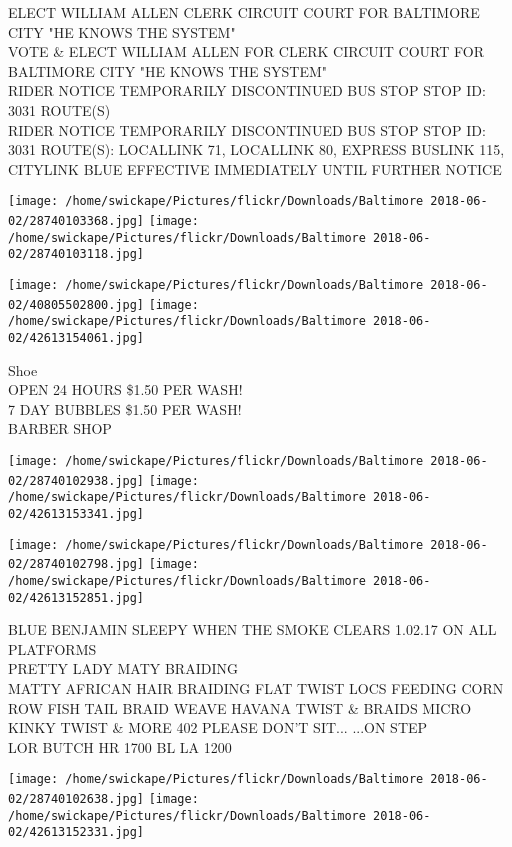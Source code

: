 \documentclass[10pt,letterpaper]{article}
\begin{document}
ELECT WILLIAM ALLEN CLERK CIRCUIT COURT FOR BALTIMORE CITY "HE KNOWS THE SYSTEM"\\
VOTE \& ELECT WILLIAM ALLEN FOR CLERK CIRCUIT COURT FOR BALTIMORE CITY "HE KNOWS THE SYSTEM"\\
RIDER NOTICE TEMPORARILY DISCONTINUED BUS STOP STOP ID: 3031 ROUTE(S)\\
RIDER NOTICE TEMPORARILY DISCONTINUED BUS STOP STOP ID: 3031 ROUTE(S): LOCALLINK 71, LOCALLINK 80, EXPRESS BUSLINK 115, CITYLINK BLUE EFFECTIVE IMMEDIATELY UNTIL FURTHER NOTICE\\
\pagebreak

\texttt{[image: /home/swickape/Pictures/flickr/Downloads/Baltimore 2018-06-02/28740103368.jpg]}
\texttt{[image: /home/swickape/Pictures/flickr/Downloads/Baltimore 2018-06-02/28740103118.jpg]}

\texttt{[image: /home/swickape/Pictures/flickr/Downloads/Baltimore 2018-06-02/40805502800.jpg]}
\texttt{[image: /home/swickape/Pictures/flickr/Downloads/Baltimore 2018-06-02/42613154061.jpg]}

Shoe\\
OPEN 24 HOURS \$1.50 PER WASH!\\
7 DAY BUBBLES \$1.50 PER WASH!\\
BARBER SHOP\\
\pagebreak

\texttt{[image: /home/swickape/Pictures/flickr/Downloads/Baltimore 2018-06-02/28740102938.jpg]}
\texttt{[image: /home/swickape/Pictures/flickr/Downloads/Baltimore 2018-06-02/42613153341.jpg]}

\texttt{[image: /home/swickape/Pictures/flickr/Downloads/Baltimore 2018-06-02/28740102798.jpg]}
\texttt{[image: /home/swickape/Pictures/flickr/Downloads/Baltimore 2018-06-02/42613152851.jpg]}

BLUE BENJAMIN SLEEPY WHEN THE SMOKE CLEARS 1.02.17 ON ALL PLATFORMS\\
PRETTY LADY MATY BRAIDING\\
MATTY AFRICAN HAIR BRAIDING FLAT TWIST LOCS FEEDING CORN ROW FISH TAIL BRAID WEAVE HAVANA TWIST \& BRAIDS MICRO KINKY TWIST \& MORE 402 PLEASE DON'T SIT... ...ON STEP\\
LOR BUTCH HR 1700 BL LA 1200\\
\pagebreak

\texttt{[image: /home/swickape/Pictures/flickr/Downloads/Baltimore 2018-06-02/28740102638.jpg]}
\texttt{[image: /home/swickape/Pictures/flickr/Downloads/Baltimore 2018-06-02/42613152331.jpg]}
\end{document}
